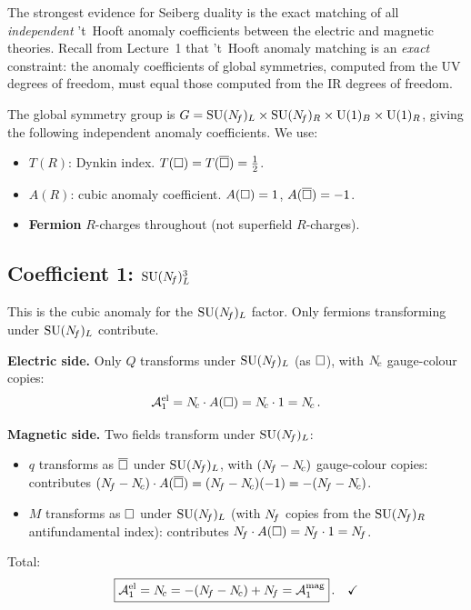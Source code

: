 \documentclass[11pt,a4paper]{article}
\begin{document}
The strongest evidence for Seiberg duality is the exact matching of all
\emph{independent} 't~Hooft anomaly coefficients between the electric and
magnetic theories.  Recall from Lecture~1 that 't~Hooft anomaly matching is
an \emph{exact} constraint: the anomaly coefficients of global symmetries,
computed from the UV degrees of freedom, must equal those computed from the
IR degrees of freedom.

The global symmetry group is
$G = \mathrm{SU}(N_{\!f})_L \times \mathrm{SU}(N_{\!f})_R \times \mathrm{U}(1)_B \times \mathrm{U}(1)_R$, giving
the following independent anomaly coefficients.  We use:
\begin{itemize}
  \item $T(R)$: Dynkin index.  $T(\square) = T(\overline{\square}) = \tfrac{1}{2}$.
  \item $A(R)$: cubic anomaly coefficient.  $A(\square) = 1$, $A(\overline{\square}) = -1$.
  \item \textbf{Fermion} $R$-charges throughout (not superfield $R$-charges).
\end{itemize}

\subsection{Coefficient 1: $\mathrm{SU}(N_{\!f})_L^3$}
\label{ssec:anom1}

This is the cubic anomaly for the $\mathrm{SU}(N_{\!f})_L$ factor.  Only fermions
transforming under $\mathrm{SU}(N_{\!f})_L$ contribute.

\textbf{Electric side.}  Only $Q$ transforms under $\mathrm{SU}(N_{\!f})_L$ (as $\square$),
with $N_{\!c}$ gauge-colour copies:
\[
  \mathcal{A}^{\text{el}}_1 = N_{\!c} \cdot A(\square) = N_{\!c} \cdot 1 = N_{\!c}\,.
\]

\textbf{Magnetic side.}  Two fields transform under $\mathrm{SU}(N_{\!f})_L$:
\begin{itemize}
  \item $q$ transforms as $\overline{\square}$ under $\mathrm{SU}(N_{\!f})_L$, with $(N_{\!f} - N_{\!c})$
    gauge-colour copies: contributes $(N_{\!f} - N_{\!c}) \cdot A(\overline{\square})
    = (N_{\!f} - N_{\!c})(-1) = -(N_{\!f} - N_{\!c})$.
  \item $M$ transforms as $\square$ under $\mathrm{SU}(N_{\!f})_L$ (with $N_{\!f}$ copies from
    the $\mathrm{SU}(N_{\!f})_R$ antifundamental index): contributes
    $N_{\!f} \cdot A(\square) = N_{\!f} \cdot 1 = N_{\!f}$.
\end{itemize}
Total:
\begin{equation}\label{eq:anom1}
  \boxed{\mathcal{A}^{\text{el}}_1 = N_{\!c} = -(N_{\!f} - N_{\!c}) + N_{\!f}
    = \mathcal{A}^{\text{mag}}_1}\,.
  \quad\checkmark
\end{equation}
\end{document}
